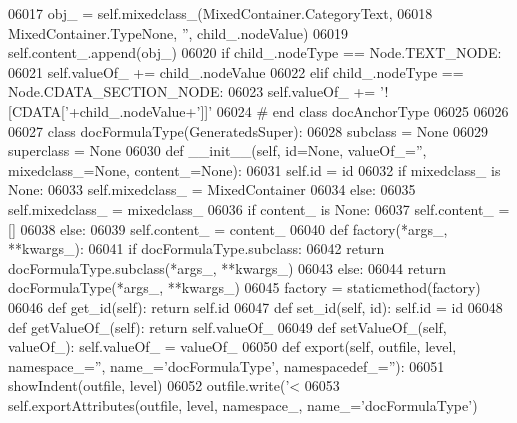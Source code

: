 \begin{DoxyCode}
{{{{{{{{{{{{{{{{{{{{{{{{{{{{{{{{{{{{{{{{{{{{{{{{{{{{{{{{{{{{{{{{{{{{{{{{{{{{{{{{{{{{{{{{{{{{{{{{{{{{{{{{{{{{{{{{{{{{{{{{{{{{{{{{{{{{{{{{{{{{{{{{{{{{{{{{{{{{{{{{{{{{{{{{{{{{{{{{{{{{{{{{{{{{{{{{{{{{{{{{{{{{{{{{{{{{{{{{{{{{{{{{{{{{{{{{{{{{{{{{{{{{{{{{{{{{{{{{{{{{{{{{{{{{{{{{{{{{{{{{{{{{{{{{{{{{{{{{{{{{{{{{{{{{{{{{{{{{{{{{{{{{{{{{{{{{{{{{{{{{{{{{{{{{{{{{{{{{{{{{{{{{{{{{{{{{{{{06017             obj\_ = self.mixedclass_(MixedContainer.CategoryText,
06018                 MixedContainer.TypeNone, \textcolor{stringliteral}{''}, child\_.nodeValue)
06019             self.content\_.append(obj\_)
06020         \textcolor{keywordflow}{if} child\_.nodeType == Node.TEXT\_NODE:
06021             self.valueOf_ += child\_.nodeValue
06022         \textcolor{keywordflow}{elif} child\_.nodeType == Node.CDATA\_SECTION\_NODE:
06023             self.valueOf_ += \textcolor{stringliteral}{'![CDATA['}+child\_.nodeValue+\textcolor{stringliteral}{']]'}
06024 \textcolor{comment}{# end class docAnchorType}
06025 
06026 
06027 \textcolor{keyword}{class }docFormulaType(GeneratedsSuper):
06028     subclass = \textcolor{keywordtype}{None}
06029     superclass = \textcolor{keywordtype}{None}
06030     \textcolor{keyword}{def }__init__(self, id=None, valueOf\_='', mixedclass\_=None, content\_=None):
06031         self.id = id
06032         \textcolor{keywordflow}{if} mixedclass\_ \textcolor{keywordflow}{is} \textcolor{keywordtype}{None}:
06033             self.mixedclass_ = MixedContainer
06034         \textcolor{keywordflow}{else}:
06035             self.mixedclass_ = mixedclass\_
06036         \textcolor{keywordflow}{if} content\_ \textcolor{keywordflow}{is} \textcolor{keywordtype}{None}:
06037             self.content_ = []
06038         \textcolor{keywordflow}{else}:
06039             self.content_ = content\_
06040     \textcolor{keyword}{def }factory(*args\_, **kwargs\_):
06041         \textcolor{keywordflow}{if} docFormulaType.subclass:
06042             \textcolor{keywordflow}{return} docFormulaType.subclass(*args\_, **kwargs\_)
06043         \textcolor{keywordflow}{else}:
06044             \textcolor{keywordflow}{return} docFormulaType(*args\_, **kwargs\_)
06045     factory = staticmethod(factory)
06046     \textcolor{keyword}{def }get_id(self): \textcolor{keywordflow}{return} self.id
06047     \textcolor{keyword}{def }set_id(self, id): self.id = id
06048     \textcolor{keyword}{def }getValueOf_(self): \textcolor{keywordflow}{return} self.valueOf\_
06049     \textcolor{keyword}{def }setValueOf_(self, valueOf\_): self.valueOf\_ = valueOf\_
06050     \textcolor{keyword}{def }export(self, outfile, level, namespace\_='', name\_='docFormulaType', namespacedef\_=''):
06051         showIndent(outfile, level)
06052         outfile.write(\textcolor{stringliteral}{'<%
06053         self.exportAttributes(outfile, level, namespace\_, name\_=\textcolor{stringliteral}{'docFormulaType'})
}}}}}}}}}}}}}}}}}}}}}}}}}}}}}}}}}}}}}}}}}}}}}}}}}}}}}}}}}}}}}}}}}}}}}}}}}}}}}}}}}}}}}}}}}}}}}}}}}}}}}}}}}}}}}}}}}}}}}}}}}}}}}}}}}}}}}}}}}}}}}}}}}}}}}}}}}}}}}}}}}}}}}}}}}}}}}}}}}}}}}}}}}}}}}}}}}}}}}}}}}}}}}}}}}}}}}}}}}}}}}}}}}}}}}}}}}}}}}}}}}}}}}}}}}}}}}}}}}}}}}}}}}}}}}}}}}}}}}}}}}}}}}}}}}}}}}}}}}}}}}}}}}}}}}}}}}}}}}}}}}}}}}}}}}}}}}}}}}}}}}}}}}}}}}}}}}}}}}}}}}}}}}}}}}}}}}}}}
\end{DoxyCode}
